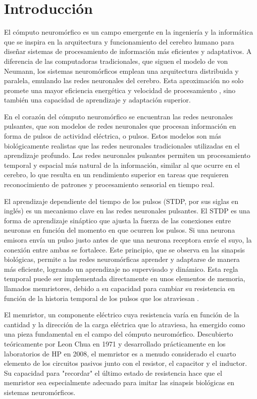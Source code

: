 \documentclass[conference]{IEEEtran}
\begin{document}
\section{Introducción}
El cómputo neuromórfico es un campo emergente en la ingeniería y la informática que se inspira en la arquitectura y funcionamiento del cerebro humano para diseñar sistemas de procesamiento de información más eficientes y adaptativos. A diferencia de las computadoras tradicionales, que siguen el modelo de von Neumann, los sistemas neuromórficos emplean una arquitectura distribuida y paralela, emulando las redes neuronales del cerebro. Esta aproximación no solo promete una mayor eficiencia energética y velocidad de procesamiento \cite{Guimaraes_2021}, sino también una capacidad de aprendizaje y adaptación superior.

En el corazón del cómputo neuromórfico se encuentran las redes neuronales pulsantes, que son modelos de redes neuronales que procesan información en forma de pulsos de actividad eléctrica, o pulsos. Estos modelos son más biológicamente realistas que las redes neuronales tradicionales utilizadas en el aprendizaje profundo. Las redes neuronales pulsantes permiten un procesamiento temporal y espacial más natural de la información, similar al que ocurre en el cerebro, lo que resulta en un rendimiento superior en tareas que requieren reconocimiento de patrones y procesamiento sensorial en tiempo real.

El aprendizaje dependiente del tiempo de los pulsos (STDP, por sus siglas en inglés) es un mecanismo clave en las redes neuronales pulsantes. El STDP es una forma de aprendizaje sináptico que ajusta la fuerza de las conexiones entre neuronas en función del momento en que ocurren los pulsos. Si una neurona emisora envía un pulso justo antes de que una neurona receptora envíe el suyo, la conexión entre ambas se fortalece. Este principio, que se observa en las sinapsis biológicas, permite a las redes neuromórficas aprender y adaptarse de manera más eficiente, logrando un aprendizaje no supervisado y dinámico. Esta regla temporal puede ser implementada directamente en unos elementos de memoria, llamados memristores, debido a su capacidad para cambiar su resistencia en función de la historia temporal de los pulsos que los atraviesan \cite{Weiss_2022} \cite{Zhao_2018}.

El memristor, un componente eléctrico cuya resistencia varía en función de la cantidad y la dirección de la carga eléctrica que lo atraviesa, ha emergido como una pieza fundamental en el campo del cómputo neuromórfico. Descubierto teóricamente por Leon Chua en 1971 \cite{Chua_1971} y desarrollado prácticamente en los laboratorios de HP en 2008, el memristor es a menudo considerado el cuarto elemento de los circuitos pasivos junto con el resistor, el capacitor y el inductor. Su capacidad para "recordar" el último estado de resistencia hace que el memristor sea especialmente adecuado para imitar las sinapsis biológicas en sistemas neuromórficos.
\end{document}
